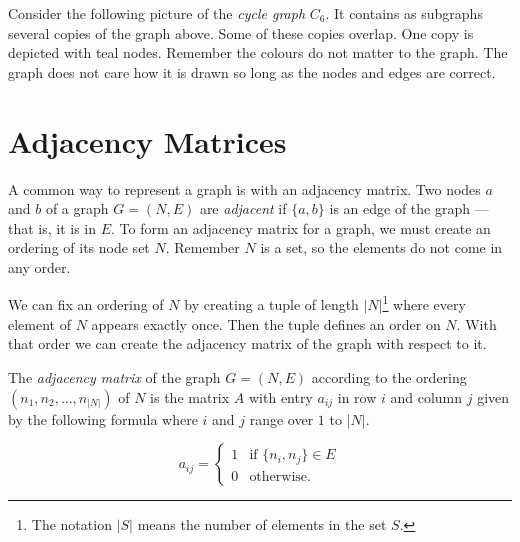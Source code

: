 \documentclass{iansnotes}
\begin{document}
  Consider the following picture of the \emph{cycle graph} $C_6$.
  It contains as subgraphs several copies of the graph above.
  Some of these copies overlap.
  One copy is depicted with teal nodes.
  Remember the colours do not matter to the graph.
  The graph does not care how it is drawn so long as the nodes and edges are correct.
  \begin{center}
  \end{center}

\section{Adjacency Matrices}
  A common way to represent a graph is with an adjacency matrix.
  Two nodes $a$ and $b$ of a graph $G = (N, E)$ are \emph{adjacent} if $\{a,b\}$ is an edge of the graph --- that is, it is in $E$.
  To form an adjacency matrix for a graph, we must create an ordering of its node set $N$.
  Remember $N$ is a set, so the elements do not come in any order.
  
  We can fix an ordering of $N$ by creating a tuple of length $|N|$\footnote{The notation $|S|$ means the number of elements in the set $S$.} where every element of $N$ appears exactly once.
  Then the tuple defines an order on $N$.
  With that order we can create the adjacency matrix of the graph with respect to it.

  The \emph{adjacency matrix} of the graph $G = (N, E)$ according to the ordering $(n_1, n_2, \ldots, n_{|N|})$ of $N$ is the matrix $A$ with entry $a_{ij}$ in row $i$ and column $j$ given by the following formula where $i$ and $j$ range over $1$ to $|N|$.
  
  \[ a_{ij} = \begin{cases} 1 & \text{if } \{n_i, n_j\} \in E \\ 0 & \text{otherwise.} \end{cases}\]
\end{document}
